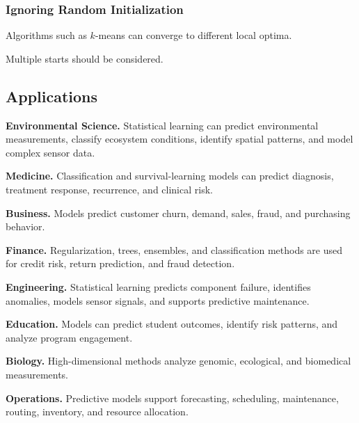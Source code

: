 \subsubsection{Ignoring Random Initialization}

Algorithms such as \(k\)-means can converge to different local optima.

Multiple starts should be considered.

\subsection{Applications}
\label{subsec:statistical-learning-applications}

\begin{applicationbox}

\textbf{Environmental Science.}
Statistical learning can predict environmental measurements, classify
ecosystem conditions, identify spatial patterns, and model complex sensor
data.

\medskip

\textbf{Medicine.}
Classification and survival-learning models can predict diagnosis,
treatment response, recurrence, and clinical risk.

\medskip

\textbf{Business.}
Models predict customer churn, demand, sales, fraud, and purchasing
behavior.

\medskip

\textbf{Finance.}
Regularization, trees, ensembles, and classification methods are used for
credit risk, return prediction, and fraud detection.

\medskip

\textbf{Engineering.}
Statistical learning predicts component failure, identifies anomalies,
models sensor signals, and supports predictive maintenance.

\medskip

\textbf{Education.}
Models can predict student outcomes, identify risk patterns, and analyze
program engagement.

\medskip

\textbf{Biology.}
High-dimensional methods analyze genomic, ecological, and biomedical
measurements.

\medskip

\textbf{Operations.}
Predictive models support forecasting, scheduling, maintenance, routing,
inventory, and resource allocation.

\end{applicationbox}

